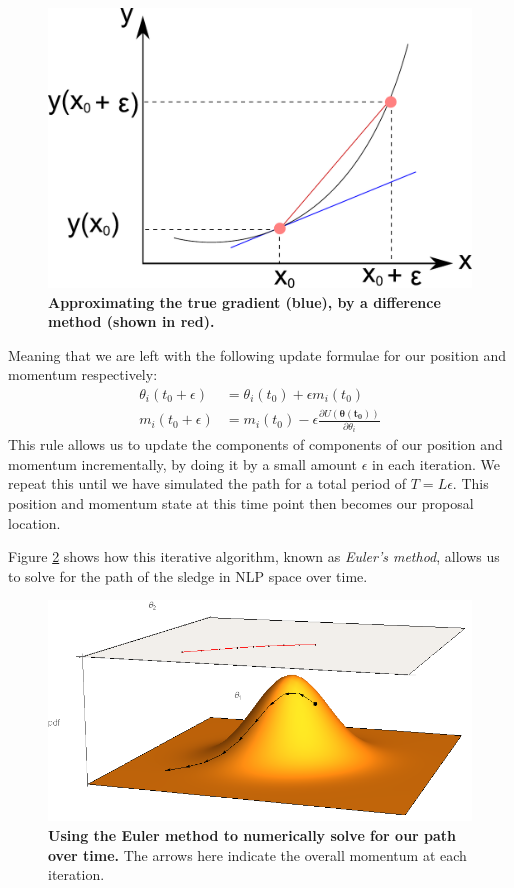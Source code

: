 \documentclass[11pt,fullpage]{book}
\begin{document}
\begin{figure}
\centerline{\includegraphics[width=1\textwidth]{HMC_differential.pdf}}
\caption{\textbf{Approximating the true gradient (blue), by a difference method (shown in red).}}\label{fig:HMC_differential}
\end{figure}

Meaning that we are left with the following update formulae for our position and momentum respectively:
%
\begin{align}
\theta_i(t_0+\epsilon) &=  \theta_i(t_0) +  \epsilon m_i(t_0)\\
m_i(t_0+\epsilon) &=  m_i(t_0) - \epsilon\frac{\partial U(\boldsymbol{\theta(t_0)})}{\partial \theta_i}
\end{align}
%
This rule allows us to update the components of components of our position and momentum incrementally, by doing it by a small amount $\epsilon$ in each iteration. We repeat this until we have simulated the path for a total period of $T=L\epsilon$. This position and momentum state at this time point then becomes our proposal location. 

Figure \ref{fig:HMC_pathOverTime} shows how this iterative algorithm, known as \textit{Euler's method}, allows us to solve for the path of the sledge in NLP space over time. 

\begin{figure}
\centerline{\includegraphics[width=1\textwidth]{HMC_pathOverTime.png}}
\caption{\textbf{Using the Euler method to numerically solve for our path over time.} The arrows here indicate the overall momentum at each iteration.}\label{fig:HMC_pathOverTime}
\end{figure}
\end{document}
